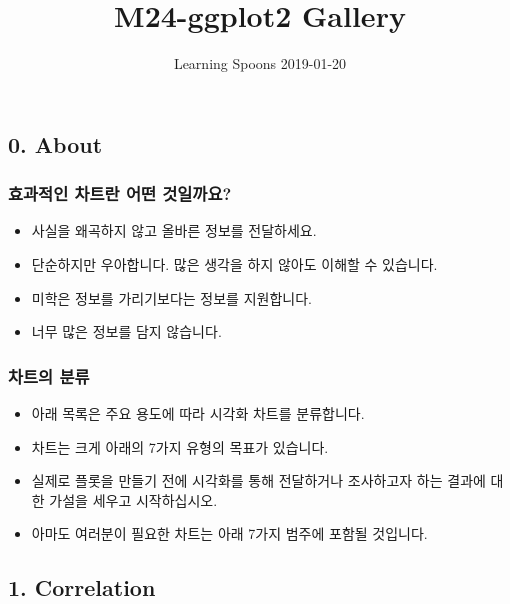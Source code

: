 \documentclass[a4paper]{article}
\title{M24-ggplot2 Gallery}
\author{Learning Spoons 2019-01-20}
\date{}
\providecommand{\tightlist}{%
  \setlength{\itemsep}{0pt}\setlength{\parskip}{0pt}}
\begin{document}
\maketitle

{
\setcounter{tocdepth}{3}
\tableofcontents
}
\subsection{0. About}\label{about}

\subsubsection{효과적인 차트란 어떤 것일까요?}\label{---}

\begin{itemize}
\tightlist
\item
  사실을 왜곡하지 않고 올바른 정보를 전달하세요.\\
\item
  단순하지만 우아합니다. 많은 생각을 하지 않아도 이해할 수 있습니다.\\
\item
  미학은 정보를 가리기보다는 정보를 지원합니다.\\
\item
  너무 많은 정보를 담지 않습니다.
\end{itemize}

\subsubsection{차트의 분류}\label{-}

\begin{itemize}
\tightlist
\item
  아래 목록은 주요 용도에 따라 시각화 차트를 분류합니다.\\
\item
  차트는 크게 아래의 7가지 유형의 목표가 있습니다.\\
\item
  실제로 플롯을 만들기 전에 시각화를 통해 전달하거나 조사하고자 하는
  결과에 대한 가설을 세우고 시작하십시오.\\
\item
  아마도 여러분이 필요한 차트는 아래 7가지 범주에 포함될 것입니다.
\end{itemize}

\newpage  

\subsection{1. Correlation}\label{correlation}
\end{document}
